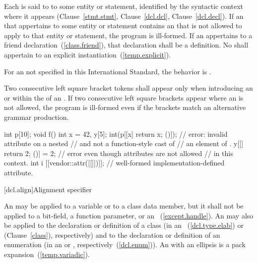 \pnum
Each  is said to  to some entity or
statement, identified by the syntactic context where it appears
(Clause~\ref{stmt.stmt}, Clause~\ref{dcl.dcl},
Clause~\ref{dcl.decl}). If an  that appertains to some
entity or statement contains an  that
is not allowed to apply to that
entity or statement, the program is ill-formed. If an 
appertains to a friend declaration~(\ref{class.friend}), that declaration shall be a
definition. No  shall appertain to an explicit
instantiation~(\ref{temp.explicit}).

\pnum
For an  not specified in this International Standard, the
behavior is .

\pnum
Two consecutive left square bracket tokens shall appear only
when introducing an  or
within the  of
an .
\enternote If two consecutive left square brackets appear
where an  is not allowed, the program is ill-formed even
if the brackets match an alternative grammar production. \exitnote \enterexample
\begin{codeblock}
int p[10];
void f() {
  int x = 42, y[5];
  int(p[[x] { return x; }()]);  // error: invalid attribute on a nested
                                //  and not a function-style cast of
                                // an element of .
  y[[] { return 2; }()] = 2;    // error even though attributes are not allowed
                                // in this context.
  int i [[vendor::attr([[]])]]; // well-formed implementation-defined attribute.
}
\end{codeblock}
\exitexample

[dcl.align]{Alignment specifier}%

\pnum
An 
may be applied to a variable
or to a class data member, but it shall not be applied to a bit-field, a function
parameter, or an ~(\ref{except.handle}).
An  may also be applied to the declaration or
definition of a class (in an
~(\ref{dcl.type.elab}) or
 (Clause~\ref{class}), respectively) and to the
declaration or definition of an enumeration (in an
 or ,
respectively~(\ref{dcl.enum})).
An  with an ellipsis is a pack expansion~(\ref{temp.variadic}).

